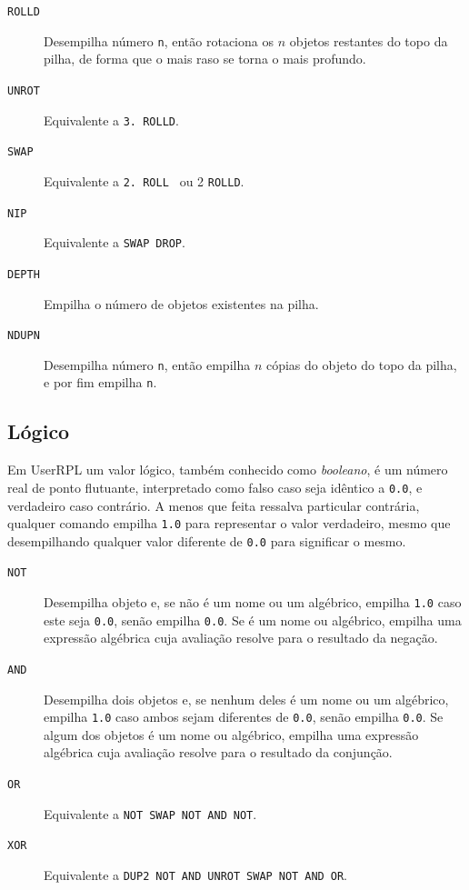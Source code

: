 \documentclass[12pt,a4paper]{report}
\newcommand{\kwd}[1]{\texttt{\textcolor{keyword}{#1}}}
\newcommand{\SWAP}{\kwd{SWAP}}   %
\newcommand{\DROP}{\kwd{DROP}}   %
\newcommand{\UNROT}{\kwd{UNROT}}   %
\newcommand{\ROLL}{\kwd{ROLL}}   %
\newcommand{\ROLLD}{\kwd{ROLLD}}   %
\newcommand{\DEPTH}{\kwd{DEPTH}}   %
\newcommand{\NIP}{\kwd{NIP}}   %
\newcommand{\NDUPN}{\kwd{NDUPN}}   %
\newcommand{\DUPTWO}{\kwd{DUP2}}   %
\newcommand{\NOT}{\kwd{NOT}}   %
\newcommand{\AND}{\kwd{AND}}   %
\newcommand{\OR}{\kwd{OR}}   %
\newcommand{\XOR}{\kwd{XOR}}   %
\numberwithin{theorem}{chapter}
\begin{document}
\begin{description}
  \item[\ROLLD]\label{ROLLD} Desempilha número \texttt{n}, então
    rotaciona os \(n\) objetos restantes do topo da pilha, de forma
    que o mais raso se torna o mais profundo.

  \item[\UNROT]\label{UNROT} Equivalente a \texttt{3. \ROLLD}.

  \item[\SWAP]\label{SWAP} Equivalente a \texttt{2. \ROLL\ } ou 2 \ROLLD.

  \item[\NIP]\label{NIP} Equivalente a \SWAP\ \DROP.

  \item[\DEPTH]\label{DEPTH} Empilha o número de objetos existentes na
    pilha.

  \item[\NDUPN]\label{NDUPN} Desempilha número \texttt{n}, então
    empilha \(n\) cópias do objeto do topo da pilha, e por fim empilha
    \texttt{n}.
\end{description}


\subsection{Lógico}

Em UserRPL um valor lógico, também conhecido como \emph{booleano}, é
um número real de ponto flutuante, interpretado como falso caso seja
idêntico a \texttt{0.0}, e verdadeiro caso contrário.  A menos que
feita ressalva particular contrária, qualquer comando empilha
\texttt{1.0} para representar o valor verdadeiro, mesmo que
desempilhando qualquer valor diferente de \texttt{0.0} para significar
o mesmo.

\begin{description}
  \item[\NOT]\label{NOT} Desempilha objeto e, se não é um nome ou um
    algébrico, empilha \texttt{1.0} caso este seja \texttt{0.0}, senão
    empilha \texttt{0.0}.  Se é um nome ou algébrico, empilha uma
    expressão algébrica cuja avaliação resolve para o resultado da
    negação.

  \item[\AND]\label{AND} Desempilha dois objetos e, se nenhum deles é
    um nome ou um algébrico, empilha \texttt{1.0} caso ambos sejam
    diferentes de \texttt{0.0}, senão empilha \texttt{0.0}.  Se algum
    dos objetos é um nome ou algébrico, empilha uma expressão
    algébrica cuja avaliação resolve para o resultado da conjunção.

  \item[\OR]\label{OR} Equivalente a \NOT\ \SWAP\ \NOT\ \AND\ \NOT.

  \item[\XOR]\label{XOR} Equivalente a
    \DUPTWO\ \NOT\ \AND\ \UNROT\ \SWAP\ \NOT\ \AND\ \OR.

\end{description}
\end{document}
